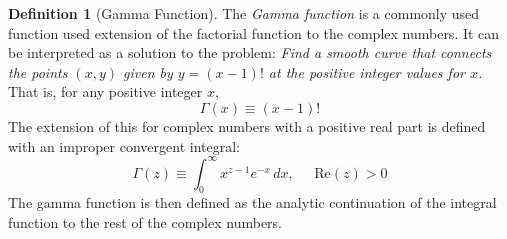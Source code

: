 \documentclass{article}
\theoremstyle{remark}
\theoremstyle{definition}
\newtheorem{definition}{Definition}[section]
\begin{document}
\begin{definition}[Gamma Function]
The \textit{Gamma function} is a commonly used function used extension of the factorial function to the complex numbers. It can be interpreted as a solution to the problem: \textit{Find a smooth curve that connects the points $(x, y)$ given by $y = (x-1)!$ at the positive integer values for $x$.} That is, for any positive integer $x$, 
\[\Gamma(x) \equiv (x-1)!\]
The extension of this for complex numbers with a positive real part is defined with an improper convergent integral: 
\[\Gamma(z) \equiv \int_{0}^\infty x^{z-1} e^{-x}\, dx, \;\;\;\;\; \text{Re}(z) > 0\]
The gamma function is then defined as the analytic continuation of the integral function to the rest of the complex numbers. 
\end{definition}
\end{document}
